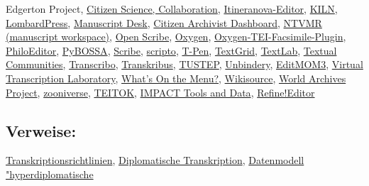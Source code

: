 \documentclass{article}
\begin{document}
{                           Edgerton Project}, \href{https://islandora.ca/}{Citizen Science,
                           Collaboration}, \href{http://www.mom-wiki.uni-koeln.de/}{Itineranova-Editor}, \href{https://kcl-ddh.github.io/kiln/}{KILN}, \href{http://lombardpress.org/}{LombardPress}, \href{https://manuscriptdesk.uantwerpen.be/md/Main_Page}{Manuscript
                           Desk}, \href{https://www.archives.gov/citizen-archivist/missions}{Citizen
                           Archivist Dashboard}, \href{http://ntvmr.uni-muenster.de/de/manuscript-workspace}{NTVMR
                           (manuscript workspace)}, \href{http://code.google.com/p/openscribe/}{Open
                           Scribe}, \href{http://oxygenxml.com/}{Oxygen}, \href{https://github.com/oxygenxml/TEI-Facsimile-Plugin}{Oxygen-TEI-Facsimile-Plugin}, \href{http://www.fabiovitali.it/filologia/}{PhiloEditor}, \href{http://pybossa.com/}{PyBOSSA}, \href{http://github.com/zooniverse/Scribe}{Scribe}, \href{http://scripto.org/}{scripto}, \href{http://t-pen.org/TPEN/}{T-Pen}, \href{https://textgrid.de/}{TextGrid}, \href{https://www.textlab.org/about/}{TextLab}, \href{https://textualcommunities.org/app/}{Textual
                           Communities}, \href{http://transcribo.org/en/}{Transcribo}, \href{https://transkribus.eu/Transkribus/}{Transkribus}, \href{http://www.tustep.uni-tuebingen.de/}{TUSTEP}, \href{http://bencrowder.net/coding/unbindery/}{Unbindery}, \href{https://docs.google.com/document/d/1QsFodbmuOld4ZAmnURR2tKewE1tgRo1cGxpaIUy92Mw/edit}{EditMOM3}, \href{http://wlt.synat.pcss.pl/}{Virtual
                           Transcription Laboratory}, \href{http://menus.nypl.org/}{What's On the
                           Menu?}, \href{http://en.wikisource.org/wiki/Main_Page}{Wikisource}, \href{http://community.ancestry.co.uk/awap}{World
                           Archives Project}, \href{https://www.zooniverse.org/}{zooniverse}, \href{http://www.teitok.org/index.php?action=about}{TEITOK}, \href{https://www.digitisation.eu}{IMPACT Tools and
                           Data}, \href{https://3pc.de/}{Refine!Editor}\subsection*{Verweise:}\href{https://gams.uni-graz.at/o:konde.198}{Transkriptionsrichtlinien}, \href{https://gams.uni-graz.at/o:konde.65}{Diplomatische Transkription}, \href{https://gams.uni-graz.at/o:konde.50}{Datenmodell "hyperdiplomatische
}
\end{document}
